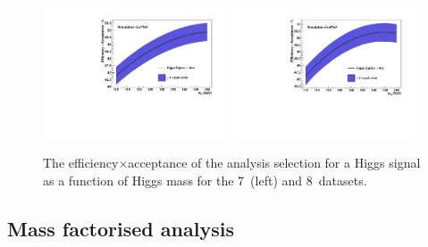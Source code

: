 \begin{figure}
  \includegraphics[width=0.49\textwidth]{analysis/plots/effAcc_vs_mass_7TeV.pdf}
  \includegraphics[width=0.49\textwidth]{analysis/plots/effAcc_vs_mass_8TeV.pdf}
  \caption[The efficiency$\times$acceptance of the analysis selection for \acs{SM} Higgs \acs{MC}]{The efficiency$\times$acceptance of the analysis selection for a \SM Higgs signal as a function of Higgs mass for the 7~\TeV (left) and 8~\TeV datasets.}
  \label{fig:effacc}
\end{figure}

\subsection{Mass factorised analysis}
\label{sec:signal_mfm}

